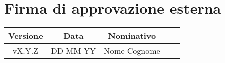 \section*{Firma di approvazione esterna}
    \begin{table}[h]
        \centering
        \renewcommand{\arraystretch}{1.5}
        \begin{tabularx}{0.98\textwidth}
            {c c c >{\centering\arraybackslash}X X}
            \rowcolor{black}
            \textbf{\color{white} Versione} & \textbf{\color{white} Data} & \textbf{\color{white} Nominativo} & \multicolumn{2}{c}{\textbf{\color{white} Firma}}\\ 
            \hline
            
            \multirow{2}{*}{vX.Y.Z} &\multirow{2}{*}{DD-MM-YY} &\multirow{2}{*}{Nome Cognome} &&\\

            &&&\multicolumn{2}{c}{\hrulefill}\\
            \hline
        \end{tabularx}
    \end{table}